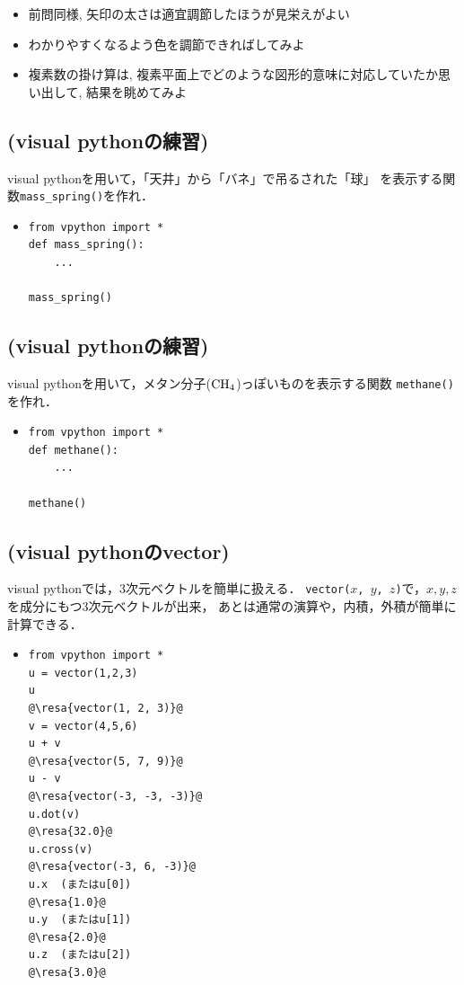 \documentclass[10pt,dvipdfmx]{article}
\newcommand{\resa}[1]{ {\textsl{$\rightarrow$ #1}}}
\begin{document}
\begin{itemize}
\item 前問同様, 矢印の太さは適宜調節したほうが見栄えがよい
\item わかりやすくなるよう色を調節できればしてみよ
\item 複素数の掛け算は, 
複素平面上でどのような図形的意味に対応していたか思い出して,
結果を眺めてみよ
\end{itemize}
\fi

\subsection{{\scriptsize (visual pythonの練習)}}
visual pythonを用いて，「天井」から「バネ」で吊るされた「球」
を表示する関数{\tt mass\_spring()}を作れ．

\begin{itemize}
\item []
\begin{lstlisting}
from vpython import *
def mass_spring():
    ...

mass_spring()
\end{lstlisting}
\end{itemize}

\subsection{{\scriptsize (visual pythonの練習)}}
visual pythonを用いて，メタン分子(${\rm CH}_4$)っぽいものを表示する関数
{\tt methane()}を作れ．

\begin{itemize}
\item []
\begin{lstlisting}
from vpython import *
def methane():
    ...

methane()
\end{lstlisting}
\end{itemize}

\subsection{{\scriptsize (visual pythonのvector)}}
\label{subsec:vector}
visual pythonでは，3次元ベクトルを簡単に扱える．
{\tt vector($x$, $y$, $z$)}で，$x, y, z$を成分にもつ3次元ベクトルが出来，
あとは通常の演算や，内積，外積が簡単に計算できる．
\begin{itemize}
\item []
\begin{lstlisting}
from vpython import *
u = vector(1,2,3)
u
@\resa{vector(1, 2, 3)}@
v = vector(4,5,6)
u + v
@\resa{vector(5, 7, 9)}@
u - v
@\resa{vector(-3, -3, -3)}@
u.dot(v)
@\resa{32.0}@
u.cross(v)
@\resa{vector(-3, 6, -3)}@
u.x  (またはu[0])
@\resa{1.0}@
u.y  (またはu[1])
@\resa{2.0}@
u.z  (またはu[2])
@\resa{3.0}@
\end{lstlisting}
\end{itemize}
\end{document}
